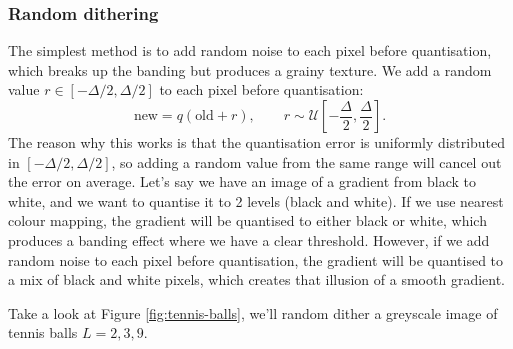 \documentclass[10pt,a4paper]{article}
\begin{document}
\subsubsection{Random dithering}
The simplest method is to add random noise to each pixel before quantisation,
which breaks up the banding but produces a grainy texture.
We add a random value $r\in[-\Delta/2, \Delta/2]$ to each pixel before quantisation:
\begin{equation}
  \text{new} = q(\text{old} + r), \qquad r \sim \mathcal{U}\!\left[-\frac{\Delta}{2}, \frac{\Delta}{2}\right].
\end{equation}
The reason why this works is that the quantisation error is uniformly distributed
in $[-\Delta/2, \Delta/2]$, so adding a random value from the same range will cancel out
the error on average.
Let's say we have an image of a gradient from black to white,
and we want to quantise it to 2 levels (black and white).
If we use nearest colour mapping, the gradient will be quantised to either black or white,
which produces a banding effect where we have a clear threshold.
However, if we add random noise to each pixel before quantisation,
the gradient will be quantised to a mix of black and white pixels,
which creates that illusion of a smooth gradient.


\newpage

Take a look at Figure \ref{fig:tennis-balls}, we'll random dither a greyscale image of tennis balls
$L={2,3,9}$. 
\end{document}
